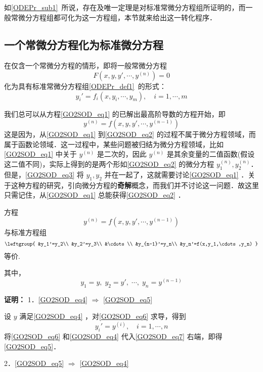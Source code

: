 
如\autoref{ODEPr_sub1}~所说，存在及唯一定理是对标准常微分方程组所证明的，而一般常微分方程组都可化为这一方程组，本节就来给出这一转化程序．

\subsection{一个常微分方程化为标准微分方程}
在仅含一个常微分方程的情形，即将一般常微分方程
\begin{equation}\label{GO2SOD_eq1}
F(x,y,y',\cdots,y^{(n)})=0
\end{equation}
化为具有标准常微分方程组\autoref{ODEPr_def1}~的形式：
\begin{equation}\label{GO2SOD_eq3}
y_i'=f_i(x,y_i,\cdots,y_m),\quad i=1,\cdots,m
\end{equation}

我们总可以从方程\autoref{GO2SOD_eq1} 的已解出最高阶导数的方程开始，即
\begin{equation}\label{GO2SOD_eq2}
y^{(n)}=f(x,y,y',\cdots,y^{(n-1)})
\end{equation}
这是因为，从\autoref{GO2SOD_eq1} 到\autoref{GO2SOD_eq2} 的过程不属于微分方程领域，而属于函数论领域．这一过程中，某些问题被归结为微分方程领域，比如\autoref{GO2SOD_eq1} 中关于 $y^{(n)}$ 是二次的，因此 $y^{(n)}$ 是其余变量的二值函数(假设这二值不同)，实际上得到的是两个形如\autoref{GO2SOD_eq2} 的微分方程 $y_1^{(n)},y_2^{(n)}$．但是，\autoref{GO2SOD_eq3} 将 $y_1,y_2$ 并在一起了，这就需要讨论\autoref{GO2SOD_eq1} ．关于这种方程的研究，引向微分方程的\textbf{奇解}概念，而我们并不讨论这一问题．故这里只需记住，从\autoref{GO2SOD_eq1} 总能获得\autoref{GO2SOD_eq2} ．
\begin{theorem}{}
方程
\begin{equation}\label{GO2SOD_eq4}
y^{(n)}=f(x,y,y',\cdots,y^{(n-1)})
\end{equation}
与标准方程组
\begin{equation}\label{GO2SOD_eq5}
\leftgroup{
&y_1'=y_2\\
&y_2'=y_3\\
&\cdots\\
&y_{n-1}'=y_n\\
&y_n'=f(x,y_1,\cdots,y_n)
}
\end{equation}
等价.

其中，
\begin{equation}\label{GO2SOD_eq6}
y_1=y,\;y_2=y',\;\cdots,\;y_n=y^{(n-1)}
\end{equation}
\end{theorem}
\textbf{证明：}
1．\autoref{GO2SOD_eq4} $\Rightarrow$ \autoref{GO2SOD_eq5} 

设 $y$ 满足\autoref{GO2SOD_eq4} ，对\autoref{GO2SOD_eq6} 求导，得到
\begin{equation}\label{GO2SOD_eq7}
y_i'=y^{(i)},\quad i=1,\cdots,n
\end{equation}
将\autoref{GO2SOD_eq6} 和\autoref{GO2SOD_eq4} 代入\autoref{GO2SOD_eq7} 右端，即得\autoref{GO2SOD_eq5}．

2．\autoref{GO2SOD_eq5} $\Rightarrow$ \autoref{GO2SOD_eq4} 